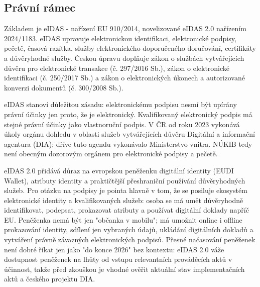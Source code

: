 \subsection*{Právní rámec}
Základem je eIDAS - nařízení EU 910/2014, novelizované eIDAS 2.0 nařízením 2024/1183. eIDAS upravuje elektronickou identifikaci, elektronické podpisy, pečetě, časová razítka, služby elektronického doporučeného doručování, certifikáty a důvěryhodné služby. Českou úpravu doplňuje zákon o službách vytvářejících důvěru pro elektronické transakce (č. 297/2016 Sb.), zákon o elektronické identifikaci (č. 250/2017 Sb.) a zákon o elektronických úkonech a autorizované konverzi dokumentů (č. 300/2008 Sb.).

eIDAS stanoví důležitou zásadu: elektronickému podpisu nesmí být upírány právní účinky jen proto, že je elektronický. Kvalifikovaný elektronický podpis má stejné právní účinky jako vlastnoruční podpis. V ČR od roku 2023 vykonává úkoly orgánu dohledu v oblasti služeb vytvářejících důvěru Digitální a informační agentura (DIA); dříve tuto agendu vykonávalo Ministerstvo vnitra. NÚKIB tedy není obecným dozorovým orgánem pro elektronické podpisy a pečetě.

eIDAS 2.0 přidává důraz na evropskou peněženku digitální identity (EUDI Wallet), atributy identity a praktičtější přeshraniční používání důvěryhodných služeb. Pro otázku na podpisy je pointa hlavně v tom, že se posiluje ekosystém elektronické identity a kvalifikovaných služeb: osoba se má umět důvěryhodně identifikovat, podepsat, prokazovat atributy a používat digitální doklady napříč EU. Peněženka nemá být jen "občanka v mobilu"; má umožnit online i offline prokazování identity, sdílení jen vybraných údajů, ukládání digitálních dokladů a vytváření právně závazných elektronických podpisů. Přesné načasování peněženek není dobré říkat jen jako "do konce 2026" bez kontextu: eIDAS 2.0 váže dostupnost peněženek na lhůty od vstupu relevantních prováděcích aktů v účinnost, takže před zkouškou je vhodné ověřit aktuální stav implementačních aktů a českého projektu DIA.


